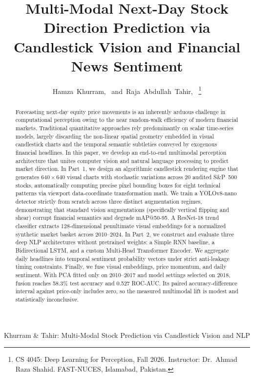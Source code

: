 \documentclass[10pt,journal]{IEEEtran}
\begin{document}
\title{Multi-Modal Next-Day Stock Direction Prediction via\\
Candlestick Vision and Financial News Sentiment}

\author{Hamza~Khurram,~
        and~Raja~Abdullah~Tahir,~%
\thanks{CS 4045: Deep Learning for Perception, Fall 2026.
        Instructor: Dr.~Ahmad Raza Shahid.
        FAST-NUCES, Islamabad, Pakistan.}}

%
{Khurram \& Tahir: Multi-Modal Stock Prediction via Candlestick Vision and NLP}

\maketitle

\begin{abstract}
Forecasting next-day equity price movements is an inherently arduous challenge in computational perception owing to the near random-walk efficiency of modern financial markets. Traditional quantitative approaches rely predominantly on scalar time-series models, largely discarding the non-linear spatial geometry embedded in visual candlestick charts and the temporal semantic subtleties conveyed by exogenous financial headlines. In this paper, we develop an end-to-end multimodal perception architecture that unites computer vision and natural language processing to predict market direction. In Part~1, we design an algorithmic candlestick rendering engine that generates $640\times640$ visual charts with stochastic variations across 20 audited S\&P~500 stocks, automatically computing precise pixel bounding boxes for eight technical patterns via viewport data-coordinate transformation math. We train a YOLOv8-nano detector strictly from scratch across three distinct augmentation regimes, demonstrating that standard vision augmentations (specifically vertical flipping and shear) corrupt financial semantics and degrade mAP@50-95. A ResNet-18 trend classifier extracts 128-dimensional penultimate visual embeddings for a normalized synthetic market basket across 2010--2024. In Part~2, we construct and evaluate three deep NLP architectures without pretrained weights: a Simple RNN baseline, a Bidirectional LSTM, and a custom Multi-Head Transformer Encoder. We aggregate daily headlines into temporal sentiment probability vectors under strict anti-leakage timing constraints. Finally, we fuse visual embeddings, price momentum, and daily sentiment. With PCA fitted only on 2010--2017 and model settings selected on 2018, fusion reaches 58.3\% test accuracy and 0.527 ROC-AUC. Its paired accuracy-difference interval against price-only includes zero, so the measured multimodal lift is modest and statistically inconclusive.
\end{abstract}
\end{document}
